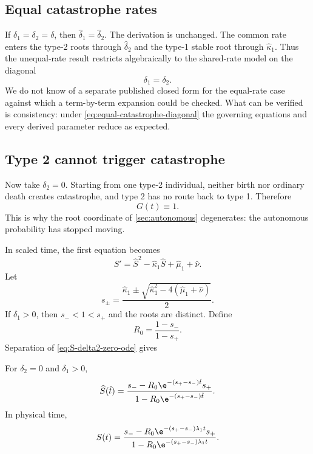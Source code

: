\subsection{Equal catastrophe rates}

If $\delta_1=\delta_2=\delta$, then $\hat\delta_1=\hat\delta_2$. The derivation is unchanged. The common rate enters the type-2 roots through $\hat\delta_2$ and the type-1 stable root through $\hat\kappa_1$. Thus the unequal-rate result restricts algebraically to the shared-rate model on the diagonal
\begin{equation}
\label{eq:equal-catastrophe-diagonal}
\delta_1=\delta_2.
\end{equation}
We do not know of a separate published closed form for the equal-rate case against which a term-by-term expansion could be checked. What can be verified is consistency: under \cref{eq:equal-catastrophe-diagonal} the governing equations and every derived parameter reduce as expected.

\subsection{Type 2 cannot trigger catastrophe}
\label{sec:delta2-zero}

Now take $\delta_2=0$. Starting from one type-2 individual, neither birth nor ordinary death creates catastrophe, and type 2 has no route back to type 1. Therefore
\begin{equation*}
G(t)\equiv1.
\end{equation*}
This is why the root coordinate of \cref{sec:autonomous} degenerates: the autonomous probability has stopped moving.

In scaled time, the first equation becomes
\begin{equation}
\label{eq:S-delta2-zero-ode}
\widehat S'
=\widehat S^2-\hat\kappa_1\widehat S
+\hat\mu_1+\hat\nu.
\end{equation}
Let
\begin{equation*}
s_{\pm}=
\frac{\hat\kappa_1\pm
\sqrt{\hat\kappa_1^2-4(\hat\mu_1+\hat\nu)}}{2}.
\end{equation*}
If $\delta_1>0$, then $s_-<1<s_+$ and the roots are distinct. Define
\begin{equation}
\label{eq:R0}
R_0=\frac{1-s_-}{1-s_+}.
\end{equation}
Separation of \cref{eq:S-delta2-zero-ode} gives
\begin{proposition}
\label{prop:delta2-zero}
For $\delta_2=0$ and $\delta_1>0$,
\begin{equation*}
\widehat S(\hat t)=
\frac{s_--R_0\e^{-(s_+-s_-)\hat t}s_+}
{1-R_0\e^{-(s_+-s_-)\hat t}}.
\end{equation*}
In physical time,
\begin{equation*}
S(t)=
\frac{s_--R_0\e^{-(s_+-s_-)\lambda_1t}s_+}
{1-R_0\e^{-(s_+-s_-)\lambda_1t}}.
\end{equation*}
\end{proposition}

